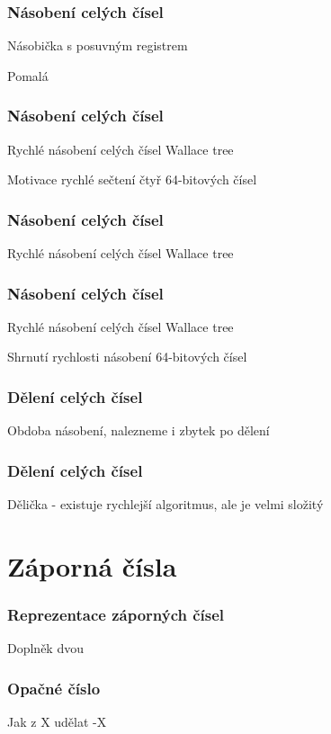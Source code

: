 \documentclass{beamer}
\begin{document}
\begin{frame}
\frametitle{Násobení celých čísel}

Násobička s posuvným registrem

Pomalá
\end{frame}


\begin{frame}
\frametitle{Násobení celých čísel}

Rychlé násobení celých čísel Wallace tree

Motivace rychlé sečtení čtyř 64-bitových čísel
\end{frame}

\begin{frame}
\frametitle{Násobení celých čísel}

Rychlé násobení celých čísel Wallace tree
\end{frame}

\begin{frame}
\frametitle{Násobení celých čísel}

Rychlé násobení celých čísel Wallace tree

Shrnutí rychlosti násobení 64-bitových čísel
\end{frame}


\begin{frame}
\frametitle{Dělení celých čísel}

Obdoba násobení, nalezneme i zbytek po dělení

\end{frame}


\begin{frame}
\frametitle{Dělení celých čísel}

Dělička - existuje rychlejší algoritmus, ale je velmi složitý

\end{frame}


\section{Záporná čísla}
\begin{frame}
\frametitle{Reprezentace záporných čísel}
Doplněk dvou

\end{frame}

\begin{frame}
\frametitle{Opačné číslo}

Jak z X udělat -X

\end{frame}
\end{document}
